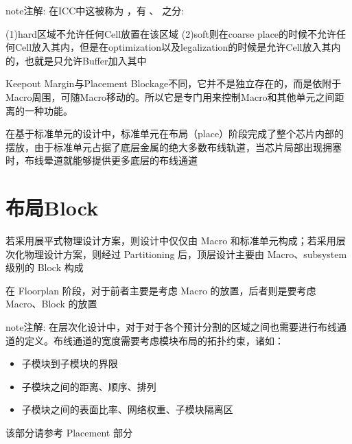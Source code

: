 \documentclass[letterpaper,10pt,english]{sphinxmanual}
\begin{document}
\begin{sphinxadmonition}{note}{注解:}
\sphinxAtStartPar
在ICC中这被称为 ，有  、  之分:

\sphinxAtStartPar
(1)hard区域不允许任何Cell放置在该区域
(2)soft则在coarse place的时候不允许任何Cell放入其内，但是在optimization以及legalization的时候是允许Cell放入其内的，也就是只允许Buffer加入其中

\sphinxAtStartPar
Keepout Margin与Placement Blockage不同，它并不是独立存在的，而是依附于Macro周围，可随Macro移动的。所以它是专门用来控制Macro和其他单元之间距离的一种功能。
\end{sphinxadmonition}

\sphinxAtStartPar
在基于标准单元的设计中，标准单元在布局（place）阶段完成了整个芯片内部的摆放，由于标准单元占据了底层金属的绝大多数布线轨道，当芯片局部出现拥塞时，布线晕道就能够提供更多底层的布线通道


\section{布局Block}
\label{\detokenize{chapter5/_u5e03_u5c40Block:block}}\label{\detokenize{chapter5/_u5e03_u5c40Block::doc}}
\sphinxAtStartPar
若采用展平式物理设计方案，则设计中仅仅由 Macro 和标准单元构成；若采用层次化物理设计方案，则经过 Partitioning 后，顶层设计主要由 Macro、sub\sphinxhyphen{}system级别的 Block 构成

\sphinxAtStartPar
在 Floorplan 阶段，对于前者主要是考虑 Macro 的放置，后者则是要考虑 Macro、Block 的放置

\begin{sphinxadmonition}{note}{注解:}
\sphinxAtStartPar
在层次化设计中，对于对于各个预计分割的区域之间也需要进行布线通道的定义。布线通道的宽度需要考虑模块布局的拓扑约束，诸如：
\end{sphinxadmonition}
\begin{itemize}
\item {} 
\sphinxAtStartPar
子模块到子模块的界限

\item {} 
\sphinxAtStartPar
子模块之间的距离、顺序、排列

\item {} 
\sphinxAtStartPar
子模块之间的表面比率、网络权重、子模块隔离区

\end{itemize}

\sphinxAtStartPar
该部分请参考 Placement 部分
\end{document}
